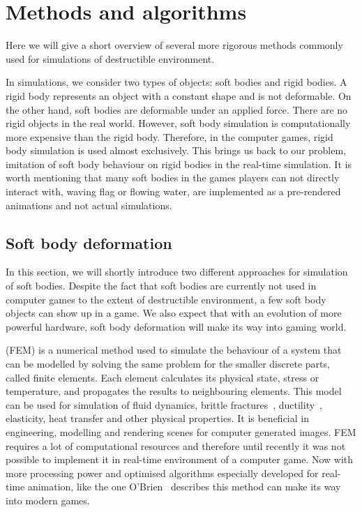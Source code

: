 \section{Methods and algorithms}

Here we will give a short overview of several more rigorous methods  commonly used for simulations of destructible environment. 

In simulations, we consider two types of objects: soft bodies and rigid bodies. A rigid body represents an object with a constant shape and is not deformable. On the other hand, soft bodies are deformable under an applied force. There are no rigid objects in the real world. However, soft body simulation is computationally more expensive than the rigid body. Therefore, in the computer games, rigid body simulation is used almost exclusively. This brings us back to our problem, imitation of soft body behaviour on rigid bodies in the real-time simulation. It is worth mentioning that many soft bodies in the games players can not directly interact with, \eg waving flag or flowing water, are implemented as a pre-rendered animations and not actual simulations.

\subsection{Soft body deformation}
In this section, we will shortly introduce two different approaches for simulation of soft bodies. Despite the fact that soft bodies are currently not used in computer games to the extent of destructible environment, a few soft body objects can show up in a game. We also expect that with an evolution of more powerful hardware, soft body deformation will make its way into gaming world.
\label{sec:softBody}

 (FEM) is a numerical method used to simulate the behaviour of a system that can be modelled by solving the same problem for the smaller discrete parts, called finite elements. Each element calculates its physical state, \eg stress or temperature, and propagates the results to neighbouring elements. This model can be used for simulation of fluid dynamics, brittle fractures~\cite{brittlefracture}, ductility~\cite{ductilefracture}, elasticity, heat transfer and other physical properties. It is beneficial in engineering, modelling and rendering scenes for computer generated images. FEM requires a lot of computational resources and therefore until recently it was not possible to implement it in real-time environment of a computer game. Now with more processing power and optimised algorithms especially developed for real-time animation, like the one O'Brien~\cite{femingames} describes this method can make its way into modern games.

